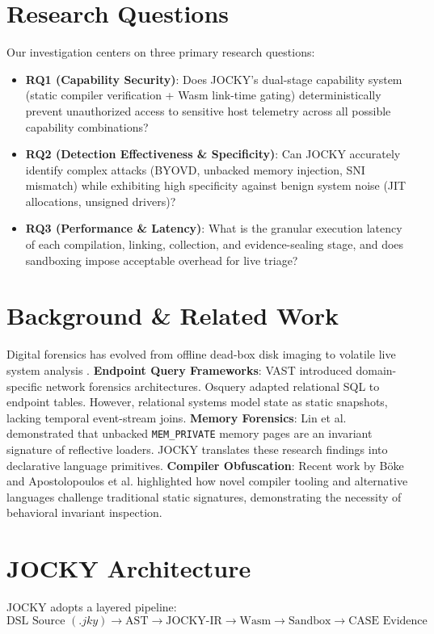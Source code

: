 \documentclass[10pt,conference]{IEEEtran}
\begin{document}
\section{Research Questions}
Our investigation centers on three primary research questions:
\begin{itemize}
    \item \textbf{RQ1 (Capability Security)}: Does JOCKY's dual-stage capability system (static compiler verification + Wasm link-time gating) deterministically prevent unauthorized access to sensitive host telemetry across all possible capability combinations?
    \item \textbf{RQ2 (Detection Effectiveness \& Specificity)}: Can JOCKY accurately identify complex attacks (BYOVD, unbacked memory injection, SNI mismatch) while exhibiting high specificity against benign system noise (JIT allocations, unsigned drivers)?
    \item \textbf{RQ3 (Performance \& Latency)}: What is the granular execution latency of each compilation, linking, collection, and evidence-sealing stage, and does sandboxing impose acceptable overhead for live triage?
\end{itemize}

\section{Background \& Related Work}
Digital forensics has evolved from offline dead-box disk imaging to volatile live system analysis \cite{ligh2014art}.
\textbf{Endpoint Query Frameworks}: VAST \cite{vallentin2016vast} introduced domain-specific network forensics architectures. Osquery adapted relational SQL to endpoint tables. However, relational systems model state as static snapshots, lacking temporal event-stream joins.
\textbf{Memory Forensics}: Lin et al. \cite{lin2022memory} demonstrated that unbacked \texttt{MEM\_PRIVATE} memory pages are an invariant signature of reflective loaders. JOCKY translates these research findings into declarative language primitives.
\textbf{Compiler Obfuscation}: Recent work by Böke \cite{boke2025camouflage} and Apostolopoulos et al. \cite{apostolopoulos2025fancy} highlighted how novel compiler tooling and alternative languages challenge traditional static signatures, demonstrating the necessity of behavioral invariant inspection.

\section{JOCKY Architecture}
JOCKY adopts a layered pipeline:
\begin{equation}
\text{DSL Source } (.jky) \rightarrow \text{AST} \rightarrow \text{JOCKY-IR} \rightarrow \text{Wasm} \rightarrow \text{Sandbox} \rightarrow \text{CASE Evidence}
\end{equation}
\end{document}
